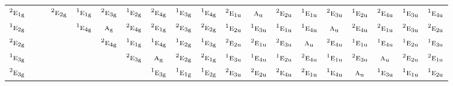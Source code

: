 \documentclass[10pt,a4paper]{article}
\numberwithin{equation}{section}
\newcommand{\irr}[1]{\text{\normalfont\scshape #1}}
\newcommand{\conjpair}[1]{{}^{#1}}
\newcommand{\ptag}[1]{\mathrm{#1}}
\begin{document}
{\begin{longtable}{@{}lcccccccccccccccccc@{}}
$\conjpair{2}\irr{e}_{1\ptag{g}}$ &  &  & $\conjpair{2}\irr{e}_{2\ptag{g}}$ & $\conjpair{1}\irr{e}_{1\ptag{g}}$ & $\conjpair{2}\irr{e}_{3\ptag{g}}$ & $\conjpair{1}\irr{e}_{2\ptag{g}}$ & $\conjpair{2}\irr{e}_{4\ptag{g}}$ & $\conjpair{1}\irr{e}_{3\ptag{g}}$ & $\conjpair{1}\irr{e}_{4\ptag{g}}$ & $\conjpair{2}\irr{e}_{1\ptag{u}}$ & $\irr{a}_{\ptag{u}}$ & $\conjpair{2}\irr{e}_{2\ptag{u}}$ & $\conjpair{1}\irr{e}_{1\ptag{u}}$ & $\conjpair{2}\irr{e}_{3\ptag{u}}$ & $\conjpair{1}\irr{e}_{2\ptag{u}}$ & $\conjpair{2}\irr{e}_{4\ptag{u}}$ & $\conjpair{1}\irr{e}_{3\ptag{u}}$ & $\conjpair{1}\irr{e}_{4\ptag{u}}$\\
$\conjpair{1}\irr{e}_{2\ptag{g}}$ &  &  &  & $\conjpair{1}\irr{e}_{4\ptag{g}}$ & $\irr{a}_{\ptag{g}}$ & $\conjpair{2}\irr{e}_{4\ptag{g}}$ & $\conjpair{2}\irr{e}_{1\ptag{g}}$ & $\conjpair{2}\irr{e}_{3\ptag{g}}$ & $\conjpair{2}\irr{e}_{2\ptag{g}}$ & $\conjpair{1}\irr{e}_{2\ptag{u}}$ & $\conjpair{1}\irr{e}_{3\ptag{u}}$ & $\conjpair{1}\irr{e}_{1\ptag{u}}$ & $\conjpair{1}\irr{e}_{4\ptag{u}}$ & $\irr{a}_{\ptag{u}}$ & $\conjpair{2}\irr{e}_{4\ptag{u}}$ & $\conjpair{2}\irr{e}_{1\ptag{u}}$ & $\conjpair{2}\irr{e}_{3\ptag{u}}$ & $\conjpair{2}\irr{e}_{2\ptag{u}}$\\
$\conjpair{2}\irr{e}_{2\ptag{g}}$ &  &  &  &  & $\conjpair{2}\irr{e}_{4\ptag{g}}$ & $\conjpair{1}\irr{e}_{1\ptag{g}}$ & $\conjpair{1}\irr{e}_{4\ptag{g}}$ & $\conjpair{1}\irr{e}_{2\ptag{g}}$ & $\conjpair{1}\irr{e}_{3\ptag{g}}$ & $\conjpair{2}\irr{e}_{2\ptag{u}}$ & $\conjpair{2}\irr{e}_{1\ptag{u}}$ & $\conjpair{2}\irr{e}_{3\ptag{u}}$ & $\irr{a}_{\ptag{u}}$ & $\conjpair{2}\irr{e}_{4\ptag{u}}$ & $\conjpair{1}\irr{e}_{1\ptag{u}}$ & $\conjpair{1}\irr{e}_{4\ptag{u}}$ & $\conjpair{1}\irr{e}_{2\ptag{u}}$ & $\conjpair{1}\irr{e}_{3\ptag{u}}$\\
$\conjpair{1}\irr{e}_{3\ptag{g}}$ &  &  &  &  &  & $\conjpair{2}\irr{e}_{3\ptag{g}}$ & $\irr{a}_{\ptag{g}}$ & $\conjpair{2}\irr{e}_{2\ptag{g}}$ & $\conjpair{2}\irr{e}_{1\ptag{g}}$ & $\conjpair{1}\irr{e}_{3\ptag{u}}$ & $\conjpair{1}\irr{e}_{4\ptag{u}}$ & $\conjpair{1}\irr{e}_{2\ptag{u}}$ & $\conjpair{2}\irr{e}_{4\ptag{u}}$ & $\conjpair{1}\irr{e}_{1\ptag{u}}$ & $\conjpair{2}\irr{e}_{3\ptag{u}}$ & $\irr{a}_{\ptag{u}}$ & $\conjpair{2}\irr{e}_{2\ptag{u}}$ & $\conjpair{2}\irr{e}_{1\ptag{u}}$\\
$\conjpair{2}\irr{e}_{3\ptag{g}}$ &  &  &  &  &  &  & $\conjpair{1}\irr{e}_{3\ptag{g}}$ & $\conjpair{1}\irr{e}_{1\ptag{g}}$ & $\conjpair{1}\irr{e}_{2\ptag{g}}$ & $\conjpair{2}\irr{e}_{3\ptag{u}}$ & $\conjpair{2}\irr{e}_{2\ptag{u}}$ & $\conjpair{2}\irr{e}_{4\ptag{u}}$ & $\conjpair{2}\irr{e}_{1\ptag{u}}$ & $\conjpair{1}\irr{e}_{4\ptag{u}}$ & $\irr{a}_{\ptag{u}}$ & $\conjpair{1}\irr{e}_{3\ptag{u}}$ & $\conjpair{1}\irr{e}_{1\ptag{u}}$ & $\conjpair{1}\irr{e}_{2\ptag{u}}$\\

\end{longtable}}
\end{document}
